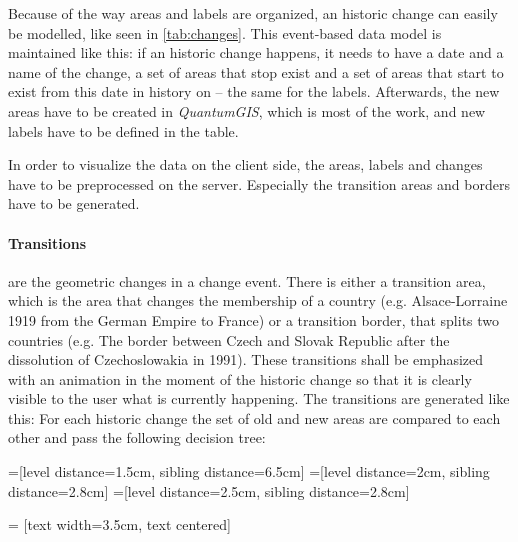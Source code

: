 Because of the way areas and labels are organized, an historic change can easily be modelled, like seen in \ref{tab:changes}. This event-based data model is maintained like this: if an historic change happens, it needs to have a date and a name of the change, a set of areas that stop exist and a set of areas that start to exist from this date in history on -- the same for the labels. Afterwards, the new areas have to be created in \textit{QuantumGIS}, which is most of the work, and new labels have to be defined in the table.

In order to visualize the data on the client side, the areas, labels and changes have to be preprocessed on the server. Especially the transition areas and borders have to be generated.

\newpage
\paragraph{Transitions} are the geometric changes in a change event. There is either a transition area, which is the area that changes the membership of a country (e.g. Alsace-Lorraine 1919 from the German Empire to France) or a transition border, that splits two countries (e.g. The border between Czech and Slovak Republic after the dissolution of Czechoslowakia in 1991). These transitions shall be emphasized with an animation in the moment of the historic change so that it is clearly visible to the user what is currently happening. The transitions are generated like this: For each historic change the set of old and new areas are compared to each other and pass the following decision tree:

=[level distance=1.5cm, sibling distance=6.5cm]
=[level distance=2cm, sibling distance=2.8cm]
=[level distance=2.5cm, sibling distance=2.8cm]

 = [text width=3.5cm, text centered]


